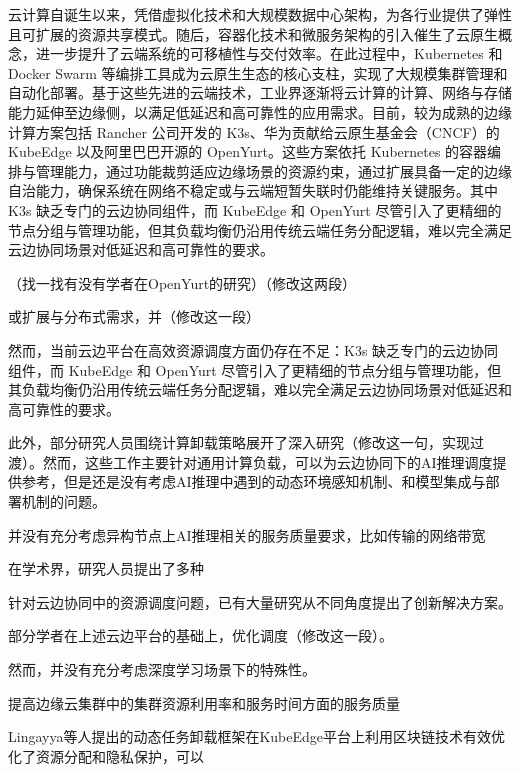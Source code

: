 云计算自诞生以来，凭借虚拟化技术和大规模数据中心架构，为各行业提供了弹性且可扩展的资源共享模式。随后，容器化技术和微服务架构的引入催生了云原生概念，进一步提升了云端系统的可移植性与交付效率\cite{deng2024cloud}。在此过程中，Kubernetes\cite{kubernetes} 和 Docker Swarm\cite{dockerswarm} 等编排工具成为云原生生态的核心支柱，实现了大规模集群管理和自动化部署。基于这些先进的云端技术，工业界逐渐将云计算的计算、网络与存储能力延伸至边缘侧，以满足低延迟和高可靠性的应用需求。目前，较为成熟的边缘计算方案包括 Rancher 公司开发的 K3s\cite{fogli2021performance}、华为贡献给云原生基金会（CNCF）的 KubeEdge\cite{xiong2018extend} 以及阿里巴巴开源的 OpenYurt\cite{openyurt2023}。这些方案依托 Kubernetes 的容器编排与管理能力，通过功能裁剪适应边缘场景的资源约束，通过扩展具备一定的边缘自治能力，确保系统在网络不稳定或与云端短暂失联时仍能维持关键服务。其中K3s 缺乏专门的云边协同组件，而 KubeEdge 和 OpenYurt 尽管引入了更精细的节点分组与管理功能，但其负载均衡仍沿用传统云端任务分配逻辑，难以完全满足云边协同场景对低延迟和高可靠性的要求。

（找一找有没有学者在OpenYurt的研究）（修改这两段）

或扩展与分布式需求，并（修改这一段）

然而，当前云边平台在高效资源调度方面仍存在不足：K3s 缺乏专门的云边协同组件，而 KubeEdge 和 OpenYurt 尽管引入了更精细的节点分组与管理功能，但其负载均衡仍沿用传统云端任务分配逻辑，难以完全满足云边协同场景对低延迟和高可靠性的要求。



此外，部分研究人员围绕计算卸载策略展开了深入研究（修改这一句，实现过渡）。然而，这些工作主要针对通用计算负载，可以为云边协同下的AI推理调度提供参考，但是还是没有考虑AI推理中遇到的动态环境感知机制、和模型集成与部署机制的问题。

并没有充分考虑异构节点上AI推理相关的服务质量要求，比如传输的网络带宽

在学术界，研究人员提出了多种

针对云边协同中的资源调度问题，已有大量研究从不同角度提出了创新解决方案。

部分学者在上述云边平台的基础上，优化调度（修改这一段）。





然而，并没有充分考虑深度学习场景下的特殊性。



提高边缘云集群中的集群资源利用率和服务时间方面的服务质量


Lingayya等人\cite{lingayya2024dynamic}提出的动态任务卸载框架在KubeEdge平台上利用区块链技术有效优化了资源分配和隐私保护，可以

